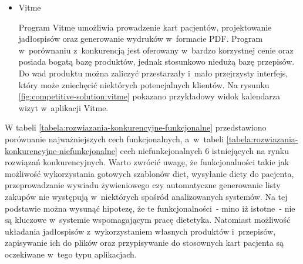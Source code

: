 \begin{itemize}

    \item Vitme

        Program Vitme\cite{url:vitme} umożliwia prowadzenie kart pacjentów, projektowanie jadłospisów oraz generowanie wydruków w~formacie PDF.
        Program w~porównaniu z~konkurencją jest oferowany w~bardzo korzystnej cenie oraz posiada bogatą bazę produktów, jednak stosunkowo niedużą bazę przepisów.
        Do wad produktu można zaliczyć przestarzały i~mało przejrzysty interfejs, który może zniechęcić niektórych potencjalnych klientów.
        Na rysunku \ref{fig:competitive-solution:vitme} pokazano przykładowy widok kalendarza wizyt w~aplikacji Vitme.


\end{itemize}

W tabeli \ref{tabela:rozwiazania-konkurencyjne-funkcjonalne} przedstawiono porównanie najważniejszych cech funkcjonalnych,
a~w~tabeli \ref{tabela:rozwiazania-konkurencyjne-niefunkcjonalne} cech niefunkcjonalnych
6 istniejących na rynku rozwiązań konkurencyjnych\cite{url:porownanie-programow-dietetycznych}.
Warto zwrócić uwagę, że funkcjonalności takie jak możliwość wykorzystania gotowych szablonów diet, wysyłanie diety do pacjenta,
przeprowadzanie wywiadu żywieniowego czy automatyczne generowanie listy zakupów nie występują w~niektórych spośród analizowanych systemów.
Na tej podstawie można wysunąć hipotezę, że te funkcjonalności~- mino iż istotne~- nie są kluczowe w~systemie wspomagającym pracę dietetyka.
Natomiast możliwość układania jadłospisów z~wykorzystaniem własnych produktów i~przepisów,
zapisywanie ich do plików oraz przypisywanie do stosownych kart pacjenta są oczekiwane w~tego typu aplikacjach.

